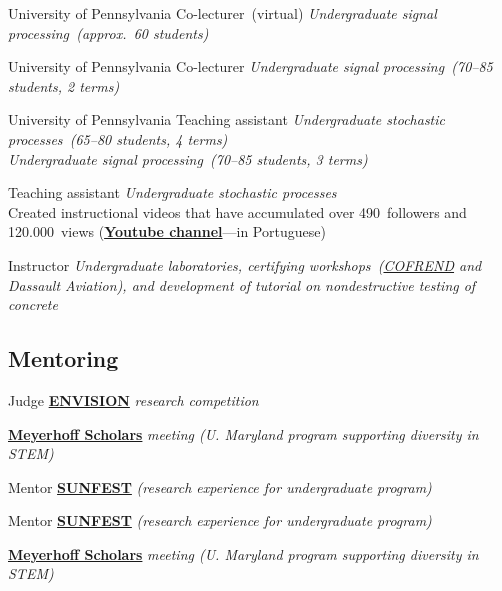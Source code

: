 \documentclass{cvlfoc}
\begin{document}
\begin{entrydate}
		{University of Pennsylvania}
		{Co-lecturer~(virtual)}
		{\emph{Undergraduate signal processing~(approx.\ 60 students)}}

		{University of Pennsylvania}
		{Co-lecturer}
		{\emph{Undergraduate signal processing~(70--85 students, 2 terms)}}

		{University of Pennsylvania}
		{Teaching assistant}
		{\emph{Undergraduate stochastic processes~(65--80 students, 4 terms)\\
		Undergraduate signal processing~(70--85 students, 3 terms)}}

		{Teaching assistant}
		{\emph{Undergraduate stochastic processes}\\
		Created instructional videos that have accumulated over
		490~followers and\\120.000~views
		(\href{https://www.youtube.com/@videos-aleatorios}{\textbf{Youtube channel}}---in Portuguese)}

		{Instructor}
		{\emph{Undergraduate laboratories, certifying workshops~(\href{https://www.cofrend.com}{\emph{COFREND}}
		and \emph{Dassault Aviation}), and development of tutorial on nondestructive
		testing of concrete}}
\end{entrydate}


\subsection*{Mentoring}

\begin{entrydate}
		{Judge}
		{\href{http://envisionrc.com/}{\textbf{ENVISION}}
			\emph{research competition}}

		{}
		{\href{https://meyerhoff.umbc.edu/}{\textbf{Meyerhoff Scholars}}
			\emph{meeting (U. Maryland program supporting diversity in STEM)}}

		{Mentor}
		{\href{https://sunfest.seas.upenn.edu}{\textbf{SUNFEST}}
			\emph{(research experience for undergraduate program)}}

		{Mentor}
		{\href{https://sunfest.seas.upenn.edu}{\textbf{SUNFEST}}
			\emph{(research experience for undergraduate program)}}

		{}
		{\href{https://meyerhoff.umbc.edu/}{\textbf{Meyerhoff Scholars}}
			\emph{meeting (U. Maryland program supporting diversity in STEM)}}
\end{entrydate}
\end{document}
